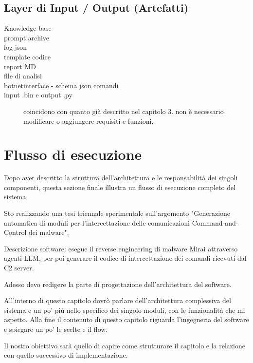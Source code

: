\subsection{Layer di Input / Output (Artefatti)}

\begin{description}
    \item[Knowledge base]
    \item[prompt archive] 
    \item[log json] 
    \item[template codice] 
    \item[report MD]
    \item[file di analisi]
    \item[botnetinterface - schema json comandi] 
    \item[input .bin e output .py] coincidono con quanto già descritto nel capitolo 3. non è necessario modificare o aggiungere requisiti e funzioni.
\end{description}

\section{Flusso di esecuzione} %

Dopo aver descritto la struttura dell'architettura e le responsabilità dei singoli componenti, questa sezione finale illustra un flusso di esecuzione completo del sistema.



Sto realizzando una tesi triennale sperimentale sull'argomento "Generazione automatica di moduli per l'intercettazione delle comunicazioni Command-and-Control dei malware".

Descrizione software: esegue il reverse engineering di malware Mirai attraverso agenti LLM, per poi generare il codice di intercettazione dei comandi ricevuti dal C2 server.

Adesso devo redigere la parte di progettazione dell'architettura del software.

All'interno di questo capitolo dovrò parlare dell'architettura complessiva del sistema e un po' più nello specifico dei singolo moduli, con le funzionalità che mi aspetto. Alla fine il contenuto di questo capitolo riguarda l'ingegneria del software e spiegare un po' le scelte e il flow.

Il nostro obiettivo sarà quello di capire come strutturare il capitolo e la relazione con quello successivo di implementazione.


